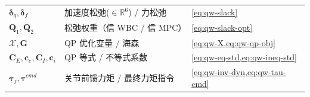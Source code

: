 \begin{table}[H]
\begin{tabular}{lll}
$\boldsymbol{\delta}_{\ddot{q}},\boldsymbol{\delta}_f$ & 加速度松弛($\in\mathbb{R}^6$) / 力松弛 & \cref{eq:qw-slack} \\
$\boldsymbol{Q}_1,\boldsymbol{Q}_2$ & 松弛权重（信 WBC / 信 MPC）& \cref{eq:qw-slack-opt} \\
$\boldsymbol{\mathcal{X}},\boldsymbol{G}$ & QP 优化变量 / 海森 & \cref{eq:qw-X,eq:qw-qp-obj} \\
$\boldsymbol{C}_E,\boldsymbol{c}_e,\boldsymbol{C}_I,\boldsymbol{c}_i$ & QP 等式 / 不等式系数 & \cref{eq:qw-eq-std,eq:qw-ineq-std} \\
$\boldsymbol{\tau}_j,\boldsymbol{\tau}^{cmd}$ & 关节前馈力矩 / 最终力矩指令 & \cref{eq:qw-inv-dyn,eq:qw-tau-cmd} \\
\bottomrule
\end{tabular}
\end{table}

